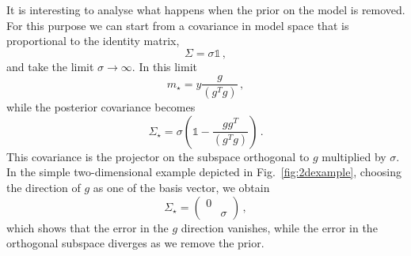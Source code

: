 It is interesting to analyse what happens when the prior on the model is
removed. For this purpose we can start from a covariance in model space that is
proportional to the identity matrix, 
\begin{equation}
  \label{eq:DiagCovSigma}
  \Sigma = \sigma \mathbb{1}\, ,
\end{equation}
and take the limit $\sigma \to \infty$. In this limit
\begin{equation}
  \label{eq:LargeSigmaLimit}
  m_\star = y \frac{g}{(g^T g)}\, ,
\end{equation}
while the posterior covariance becomes
\begin{equation}
  \label{eq:ExplcitCov}
  \Sigma_\star= \sigma \left(
    \mathbb{1} - \frac{g g^T}{(g^T g)}
  \right)\, .
\end{equation}
This covariance is the projector on the subspace orthogonal to $g$ multiplied by
$\sigma$. In the simple two-dimensional example depicted in Fig.~\ref{fig:2dexample}, choosing the direction of $g$
as one of the basis vector, we obtain
\begin{equation}
  \label{eq:ExplCovTwo}
  \Sigma_\star = 
  \begin{pmatrix}
    0 & \\
    & \sigma
  \end{pmatrix}\, ,
\end{equation}
which shows that the error in the $g$ direction vanishes, while the error in the
orthogonal subspace diverges as we remove the prior. 

